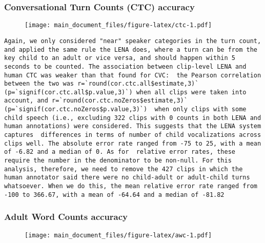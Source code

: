 \documentclass[english,floatsintext,man]{apa6}
\begin{document}
\subsubsection{Conversational Turn Counts (CTC)
accuracy}\label{conversational-turn-counts-ctc-accuracy}

\begin{figure}
\centering
\texttt{[image: main\_document\_files/figure-latex/ctc-1.pdf]}
\caption{}
\end{figure}

\begin{verbatim}
Again, we only considered "near" speaker categories in the turn count, and applied the same rule the LENA does, where a turn can be from the key child to an adult or vice versa, and should happen within 5 seconds to be counted. The association between clip-level LENA and human CTC was weaker than that found for CVC:  the Pearson correlation between the two was r=`round(cor.ctc.all$estimate,3)` (p=`signif(cor.ctc.all$p.value,3)`) when all clips were taken into account, and r=`round(cor.ctc.noZeros$estimate,3)` (p=`signif(cor.ctc.noZeros$p.value,3)`)  when only clips with some child speech (i.e., excluding 322 clips with 0 counts in both LENA and human annotations) were considered. This suggests that the LENA system captures  differences in terms of number of child vocalizations across clips well. The absolute error rate ranged from -75 to 25, with a mean of -6.82 and a median of 0. As for  relative error rates, these require the number in the denominator to be non-null. For this analysis, therefore, we need to remove the 427 clips in which the human annotator said there were no child-adult or adult-child turns  whatsoever. When we do this, the mean relative error rate ranged from -100 to 366.67, with a mean of -64.64 and a median of -81.82
\end{verbatim}

\subsubsection{Adult Word Counts
accuracy}\label{adult-word-counts-accuracy}

\begin{figure}
\centering
\texttt{[image: main\_document\_files/figure-latex/awc-1.pdf]}
\caption{}
\end{figure}
\end{document}
